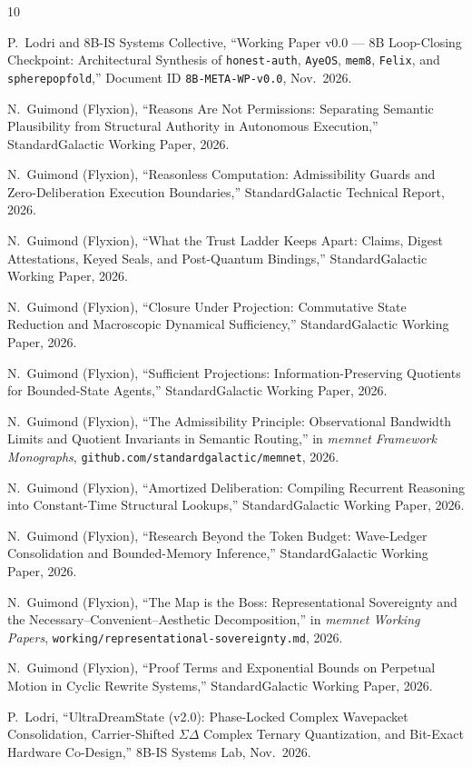 \documentclass[10pt,twocolumn,letterpaper]{article}
\begin{document}
\begin{thebibliography}{10}
\footnotesize
\setlength{\itemsep}{1.5pt}

P.~Lodri and 8B-IS Systems Collective, ``Working Paper v0.0 --- 8B Loop-Closing Checkpoint: Architectural Synthesis of \texttt{honest-auth}, \texttt{AyeOS}, \texttt{mem8}, \texttt{Felix}, and \texttt{spherepopfold},'' Document ID \texttt{8B-META-WP-v0.0}, Nov.\ 2026.

N.~Guimond (Flyxion), ``Reasons Are Not Permissions: Separating Semantic Plausibility from Structural Authority in Autonomous Execution,'' StandardGalactic Working Paper, 2026.

N.~Guimond (Flyxion), ``Reasonless Computation: Admissibility Guards and Zero-Deliberation Execution Boundaries,'' StandardGalactic Technical Report, 2026.

N.~Guimond (Flyxion), ``What the Trust Ladder Keeps Apart: Claims, Digest Attestations, Keyed Seals, and Post-Quantum Bindings,'' StandardGalactic Working Paper, 2026.

N.~Guimond (Flyxion), ``Closure Under Projection: Commutative State Reduction and Macroscopic Dynamical Sufficiency,'' StandardGalactic Working Paper, 2026.

N.~Guimond (Flyxion), ``Sufficient Projections: Information-Preserving Quotients for Bounded-State Agents,'' StandardGalactic Working Paper, 2026.

N.~Guimond (Flyxion), ``The Admissibility Principle: Observational Bandwidth Limits and Quotient Invariants in Semantic Routing,'' in \emph{memnet Framework Monographs}, \texttt{github.com/standardgalactic/memnet}, 2026.

N.~Guimond (Flyxion), ``Amortized Deliberation: Compiling Recurrent Reasoning into Constant-Time Structural Lookups,'' StandardGalactic Working Paper, 2026.

N.~Guimond (Flyxion), ``Research Beyond the Token Budget: Wave-Ledger Consolidation and Bounded-Memory Inference,'' StandardGalactic Working Paper, 2026.

N.~Guimond (Flyxion), ``The Map is the Boss: Representational Sovereignty and the Necessary--Convenient--Aesthetic Decomposition,'' in \emph{memnet Working Papers}, \texttt{working/representational-sovereignty.md}, 2026.

N.~Guimond (Flyxion), ``Proof Terms and Exponential Bounds on Perpetual Motion in Cyclic Rewrite Systems,'' StandardGalactic Working Paper, 2026.

P.~Lodri, ``UltraDreamState (v2.0): Phase-Locked Complex Wavepacket Consolidation, Carrier-Shifted $\Sigma\Delta$ Complex Ternary Quantization, and Bit-Exact Hardware Co-Design,'' 8B-IS Systems Lab, Nov.\ 2026.

\end{thebibliography}
\end{document}
